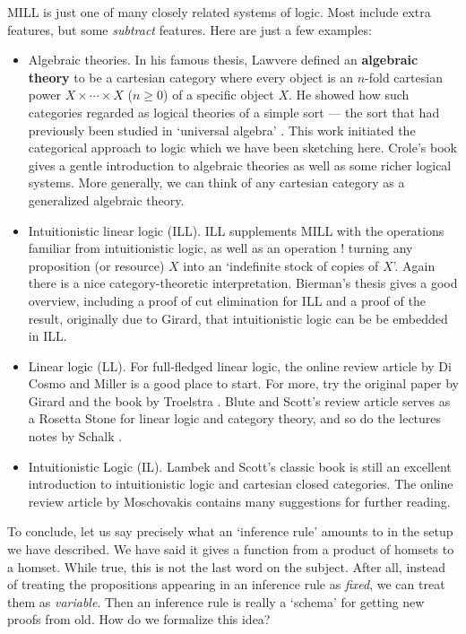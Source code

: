\documentclass[12pt,twoside,openright]{report}
\begin{document}
MILL is just one of many closely related systems of logic.  Most include extra features, but some {\it subtract} features. Here are just a few examples:

\begin{itemize}
\item Algebraic theories.   In his famous thesis, Lawvere \cite{Lawvere}
defined an {\bf algebraic theory} to be a cartesian category where every object is an $n$-fold cartesian power $X \times \cdots \times X$ 
($n \ge 0$) of a specific object $X$.  He showed how such categories regarded as logical theories of a simple sort --- the sort that had previously been studied in `universal algebra' \cite{BurrisS}.  This work initiated the categorical approach to logic which we have been sketching here.  Crole's book \cite{Crole} gives a gentle introduction to algebraic theories as well as some richer logical systems. More generally, we can think of any cartesian category as a generalized algebraic theory. 
\item Intuitionistic linear logic (ILL).  ILL
supplements MILL with the operations familiar from intuitionistic logic, as well as an operation $!$ turning any proposition (or resource) $X$ into an `indefinite stock of copies of $X$'.  Again there is a nice category-theoretic interpretation.  Bierman's thesis \cite{BiermanThesis} gives a good overview, including a proof of cut elimination for ILL and a proof of the result, originally due to Girard, that intuitionistic logic can be be embedded in ILL.
\item Linear logic (LL).  For full-fledged linear logic, the online review article by Di Cosmo and Miller \cite{dCM} is a good place to start.  For more, try the original paper by Girard \cite{Girard1} and the book by Troelstra \cite{Troelstra}. Blute and Scott's review article \cite{BS} serves as a Rosetta Stone for linear logic and category theory, and so do the lectures notes by Schalk \cite{Schalk}.  \item Intuitionistic Logic (IL).   Lambek and Scott's classic book \cite{LS} is still an excellent introduction to intuitionistic logic and cartesian closed categories.  The online review article by Moschovakis \cite{Moschovakis} contains many suggestions for further reading.
\end{itemize}

To conclude, let us say precisely what an `inference rule' amounts to in the setup we have described.  We have said it gives a function from a product of homsets to a homset.  While true, this is not the last word on the subject.  After all, instead of treating the propositions appearing in an inference rule as {\it fixed}, we can treat them as
{\it variable}.  Then an inference rule is really a `schema' for getting new proofs from old.  How do we formalize this idea?
\end{document}
